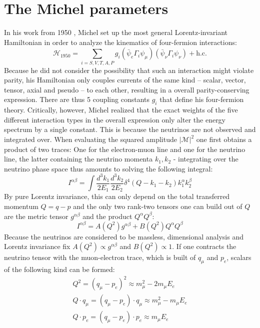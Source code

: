 \section{The Michel parameters}\label{sec:michel}
In his work from 1950 \cite{michel1950interaction}, Michel set up the most general Lorentz-invariant Hamiltonian in order to analyze the kinematics of four-fermion interactions:
\begin{equation}
    \mathcal{H}_{1950} = \sum_{i=S,V,T,A,P} g_i (\bar{\psi}_e \Gamma_i \psi_\mu) (\bar{\psi}_{\nu} \Gamma_i \psi_{\nu}) + \text{h.c.}
\end{equation}
Because he did not consider the possibility that such an interaction might violate parity, his Hamiltonian only couples currents of the same kind -- scalar, vector, tensor, axial and pseudo -- to each other, resulting in a overall parity-conserving expression. There are thus 5 coupling constants $g_i$ that define his four-fermion theory. Critically, however, Michel realized that the exact weights of the five different interaction types in the overall expression only alter the energy spectrum by a single constant. This is because the neutrinos are not observed and integrated over. When evaluating the squared amplitude $|\mathcal{M}|^2$ one first obtains a product of two traces: One for the electron-muon line and one for the neutrino line, the latter containing the neutrino momenta $k_1,k_2$ - integrating over the neutrino phase space thus amounts to solving the following integral:
\begin{equation}
    I^{\alpha\beta} = \int \frac{d^3k_1}{2E_1} \frac{d^3k_2}{2E_2} \delta^4(Q - k_1 - k_2) k_1^\alpha k_2^\beta
\end{equation}
By pure Lorentz invariance, this can only depend on the total transferred momentum $Q=q-p$ and the only two rank-two tensors one can build out of $Q$ are the metric tensor $g^{\alpha\beta}$ and the product $Q^\alpha Q^\beta$:
\begin{equation}
    I^{\alpha\beta} = A(Q^2) g^{\alpha\beta} + B(Q^2) Q^\alpha Q^\beta
\end{equation}
Because the neutrinos are considered to be massless, dimensional analysis and Lorentz invariance fix $A(Q^2)\propto g^{\alpha\beta}$ and $B(Q^2)\propto 1$. If one contracts the neutrino tensor with the muon-electron trace, which is built of $q_\mu$ and $p_e$, scalars of the following kind can be formed:
\begin{align}
    Q^2 = (q_\mu - p_e)^2 \approx m_\mu^2 - 2m_\mu E_e\\
    Q \cdot q_\mu = (q_\mu - p_e) \cdot q_\mu \approx m_\mu^2 - m_\mu E_e\\
    Q \cdot p_e = (q_\mu - p_e) \cdot p_e \approx m_\mu E_e
\end{align}
